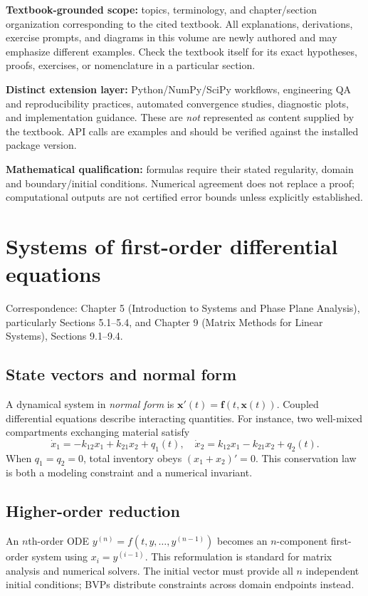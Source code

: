 \documentclass[11pt,letterpaper,oneside]{report}
\theoremstyle{definition}\newtheorem{definition}[theorem]{Definition}
\theoremstyle{remark}\newtheorem{remark}[theorem]{Remark}
\begin{document}
\begin{bookground}
\textbf{Textbook-grounded scope:} topics, terminology, and chapter/section organization corresponding to the cited textbook. All explanations, derivations, exercise prompts, and diagrams in this volume are newly authored and may emphasize different examples. Check the textbook itself for its exact hypotheses, proofs, exercises, or nomenclature in a particular section.
\end{bookground}
\begin{modern}
\textbf{Distinct extension layer:} Python/NumPy/SciPy workflows, engineering QA and reproducibility practices, automated convergence studies, diagnostic plots, and implementation guidance. These are \emph{not} represented as content supplied by the textbook. API calls are examples and should be verified against the installed package version.
\end{modern}
\begin{caution}
\textbf{Mathematical qualification:} formulas require their stated regularity, domain and boundary/initial conditions. Numerical agreement does not replace a proof; computational outputs are not certified error bounds unless explicitly established.
\end{caution}
\tableofcontents\clearpage{}
\chapter{Systems of first-order differential equations}
\begin{bookground}Correspondence: Chapter 5 (Introduction to Systems and Phase Plane Analysis), particularly Sections 5.1--5.4, and Chapter 9 (Matrix Methods for Linear Systems), Sections 9.1--9.4.\end{bookground}
\section{State vectors and normal form}
A dynamical system in \emph{normal form} is $\mathbf x'(t)=\mathbf f(t,\mathbf x(t))$. Coupled differential equations describe interacting quantities. For instance, two well-mixed compartments exchanging material satisfy
\[\dot x_1=-k_{12}x_1+k_{21}x_2+q_1(t),\quad \dot x_2=k_{12}x_1-k_{21}x_2+q_2(t).\]
When $q_1=q_2=0$, total inventory obeys $(x_1+x_2)'=0$. This conservation law is both a modeling constraint and a numerical invariant.
\section{Higher-order reduction}
An $n$th-order ODE $y^{(n)}=f(t,y,\ldots,y^{(n-1)})$ becomes an $n$-component first-order system using $x_i=y^{(i-1)}$. This reformulation is standard for matrix analysis and numerical solvers. The initial vector must provide all $n$ independent initial conditions; BVPs distribute constraints across domain endpoints instead.
\end{document}
